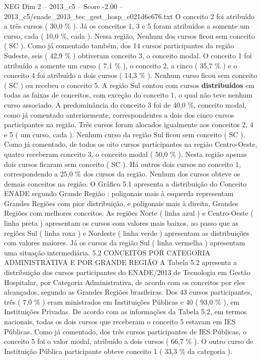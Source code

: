 \begin{textsample}{NEG Dim 2 – 2013\_c5 – Score -2.00 – 2013\_c5/enade\_2013\_tec\_gest\_hosp\_e021d6e676.txt}
O conceito 2 foi atribuído a três cursos ( 30,0 \% ).
Já os conceitos 1, 3 e 5 foram atribuídos a somente um curso, cada ( 10,0 \%, cada ).
Nessa região, Nenhum dos cursos ficou sem conceito ( SC ).
Como já comentado também, dos 14 cursos participantes da região Sudeste, seis ( 42,9 \% ) obtiveram conceito 3, o conceito modal.
O conceito 1 foi atribuído a somente um curso ( 7,1 \% ), o conceito 2, a cinco ( 35,7 \% ) e o conceito 4 foi atribuído a dois cursos ( 14,3 \% ).
Nenhum curso ficou sem conceito ( SC ) ou recebeu o conceito 5.
A região Sul contou com cursos \textbf{distribuídos} em todas as faixas de conceitos, com exceção do conceito 1, o qual não teve nenhum curso associado.
A predominância do conceito 3 foi de 40,0 \%, conceito modal, como já comentado anteriormente, correspondentes a dois dos cinco cursos participantes na região.
Três cursos foram alocados igualmente aos conceitos 2, 4 e 5 ( um curso, cada ).
Nenhum curso da região Sul ficou sem conceito ( SC ).
Como já comentado, de todos os oito cursos participantes na região Centro-Oeste, quatro receberam conceito 3, o conceito modal ( 50,0 \% ).
Nesta região apenas dois cursos ficaram sem conceito ( SC ).
Há outros dois cursos no conceito 1, correspondendo a 25,0 \% dos cursos da região.
Nenhum dos cursos obteve os demais conceitos na região.
O Gráfico 5.1 apresenta a distribuição do Conceito ENADE segundo Grande Região : poligonais mais à esquerda representam Grandes Regiões com pior distribuição, e poligonais mais à direita, Grandes Regiões com melhores conceitos.
As regiões Norte ( linha azul ) e Centro-Oeste ( linha preta ) apresentam os cursos com valores mais baixos, ao passo que as regiões Sul ( linha roxa ) e Nordeste ( linha verde ) apresentam as distribuições com valores maiores.
Já os cursos da região Sul ( linha vermelha ) apresentam uma situação intermediária. 5.2 CONCEITOS POR CATEGORIA ADMINISTRATIVA E POR GRANDE REGIÃO A Tabela 5.2 apresenta a distribuição dos cursos participantes do ENADE/2013 de Tecnologia em Gestão Hospitalar, por Categoria Administrativa, de acordo com os conceitos por eles alcançados, segundo as Grandes Regiões brasileiras.
Dos 43 cursos participantes, três ( 7,0 \% ) eram ministrados em Instituições Públicas e 40 ( 93,0 \% ), em Instituições Privadas.
De acordo com as informações da Tabela 5.2, em termos nacionais, todas os dois cursos que receberam o conceito 5 estavam em IES Públicas.
Como já comentado, dos três cursos participantes de IES Públicas, o conceito 5 foi o valor modal, atribuído a dois cursos ( 66,7 \% ).
O outro curso de Instituição Pública participante obteve conceito 1 ( 33,3 \% da categoria ).

\end{textsample}
